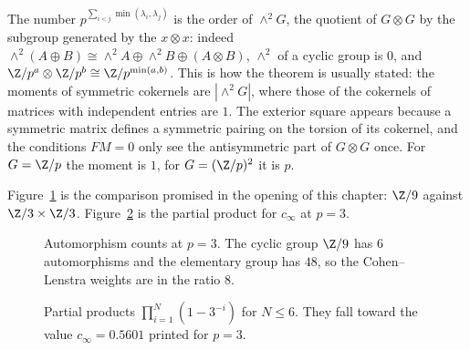 \begin{remark}\label{rem:wedge}
The number $p^{\sum_{i<j}\min(\lambda_i,\lambda_j)}$ is the order of $\wedge^2G$, the quotient of $G\otimes G$ by the subgroup generated by the $x\otimes x$: indeed $\wedge^2(A\oplus B)\cong\wedge^2A\oplus\wedge^2B\oplus(A\otimes B)$, $\wedge^2$ of a cyclic group is $0$, and $\Z/p^a\otimes\Z/p^b\cong\Z/p^{\min(a,b)}$. This is how the theorem is usually stated: the moments of symmetric cokernels are $|\wedge^2G|$, where those of the cokernels of matrices with independent entries are $1$. The exterior square appears because a symmetric matrix defines a symmetric pairing on the torsion of its cokernel, and the conditions $FM=0$ only see the antisymmetric part of $G\otimes G$ once. For $G=\Z/p$ the moment is $1$, for $G=(\Z/p)^2$ it is $p$.
\end{remark}

Figure~\ref{fig:v15c07-auts} is the comparison promised in the opening of this chapter: \(\Z/9\) against \(\Z/3\times\Z/3\). Figure~\ref{fig:v15c07-product} is the partial product for \(c_\infty\) at \(p=3\).

\begin{figure}[ht]
\centering
{}
\caption{Automorphism counts at \(p=3\). The cyclic group \(\Z/9\) has \(6\) automorphisms and the elementary group has \(48\), so the Cohen--Lenstra weights are in the ratio \(8\).}
\label{fig:v15c07-auts}
\end{figure}

\begin{figure}[ht]
\centering
{}
\caption{Partial products \(\prod_{i=1}^{N}(1-3^{-i})\) for \(N\le6\). They fall toward the value \(c_\infty=0.5601\) printed for \(p=3\).}
\label{fig:v15c07-product}
\end{figure}

